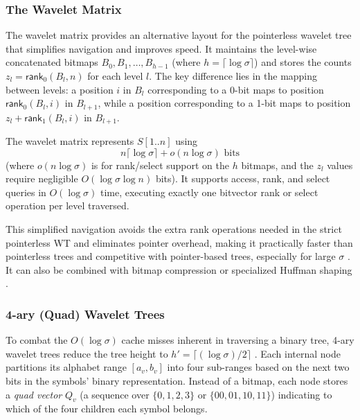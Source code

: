 \subsubsection{The Wavelet Matrix}
The wavelet matrix \cite{claude2015wavelet} provides an alternative layout for the pointerless wavelet tree that simplifies navigation and improves speed. It maintains the level-wise concatenated bitmaps $B_0, B_1, \dots, B_{h-1}$ (where $h = \lceil \log \sigma \rceil$) and stores the counts $z_l = \textsf{rank}_0(B_l, n)$ for each level $l$. The key difference lies in the mapping between levels: a position $i$ in $B_l$ corresponding to a 0-bit maps to position $\textsf{rank}_0(B_l, i)$ in $B_{l+1}$, while a position corresponding to a 1-bit maps to position $z_l + \textsf{rank}_1(B_l, i)$ in $B_{l+1}$.

\begin{theorem} \label{thm:wm_perf}
    The wavelet matrix represents $S[1..n]$ using
    \[ n \lceil \log \sigma \rceil + o(n \log \sigma) \text{ bits} \]
    (where $o(n \log \sigma)$ is for rank/select support on the $h$ bitmaps, and the $z_l$ values require negligible $O(\log \sigma \log n)$ bits). It supports \textsf{access}, \textsf{rank}, and \textsf{select} queries in $O(\log \sigma)$ time, executing exactly one bitvector rank or select operation per level traversed.
\end{theorem}

This simplified navigation avoids the extra rank operations needed in the strict pointerless WT and eliminates pointer overhead, making it practically faster than pointerless trees and competitive with pointer-based trees, especially for large $\sigma$ \cite{claude2015wavelet}. It can also be combined with bitmap compression or specialized Huffman shaping \cite{claude2015wavelet}.

\subsubsection{4-ary (Quad) Wavelet Trees}
To combat the $O(\log \sigma)$ cache misses inherent in traversing a binary tree, 4-ary wavelet trees reduce the tree height to $h' = \lceil (\log \sigma)/2 \rceil$ \cite{QWT}. Each internal node partitions its alphabet range $[a_v, b_v]$ into four sub-ranges based on the next two bits in the symbols' binary representation. Instead of a bitmap, each node stores a \emph{quad vector} $Q_v$ (a sequence over $\{0, 1, 2, 3\}$ or $\{00, 01, 10, 11\}$) indicating to which of the four children each symbol belongs.

